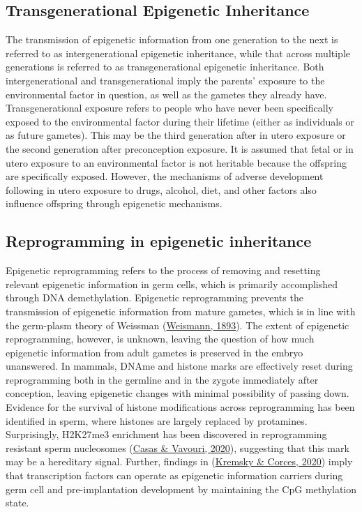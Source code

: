 \documentclass[12pt,twoside]{reedthesis}
\begin{document}
\hypertarget{tei}{%
\subsection*{Transgenerational Epigenetic Inheritance}\label{tei}}

The transmission of epigenetic information from one generation to the
next is referred to as intergenerational epigenetic inheritance, while
that across multiple generations is referred to as transgenerational
epigenetic inheritance. Both intergenerational and transgenerational
imply the parents' exposure to the environmental factor in question, as
well as the gametes they already have. Transgenerational exposure refers
to people who have never been specifically exposed to the environmental
factor during their lifetime (either as individuals or as future
gametes). This may be the third generation after in utero exposure or
the second generation after preconception exposure. It is assumed that
fetal or in utero exposure to an environmental factor is not heritable
because the offspring are specifically exposed. However, the mechanisms
of adverse development following in utero exposure to drugs, alcohol,
diet, and other factors also influence offspring through epigenetic
mechanisms.

\hypertarget{reprogramming-in-epigenetic-inheritance}{%
\subsection*{Reprogramming in epigenetic inheritance}\label{reprogramming-in-epigenetic-inheritance}}

Epigenetic reprogramming refers to the process of removing and resetting
relevant epigenetic information in germ cells, which is primarily
accomplished through DNA demethylation. Epigenetic reprogramming
prevents the transmission of epigenetic information from mature gametes,
which is in line with the germ-plasm theory of Weissman (\protect\hyperlink{ref-weismann1893}{Weismann, 1893}).
The extent of epigenetic reprogramming, however, is unknown, leaving the
question of how much epigenetic information from adult gametes is
preserved in the embryo unanswered. In mammals, DNAme and histone marks
are effectively reset during reprogramming both in the germline and in
the zygote immediately after conception, leaving epigenetic changes with
minimal possibility of passing down. Evidence for the survival of
histone modifications across reprogramming has been identified in sperm,
where histones are largely replaced by protamines. Surprisingly,
H2K27me3 enrichment has been discovered in reprogramming resistant sperm
nucleosomes (\protect\hyperlink{ref-casas2020}{Casas \& Vavouri, 2020}), suggesting that this mark may be a hereditary
signal. Further, findings in (\protect\hyperlink{ref-kremsky2020}{Kremsky \& Corces, 2020}) imply that transcription
factors can operate as epigenetic information carriers during germ cell
and pre-implantation development by maintaining the CpG methylation
state.
\end{document}
